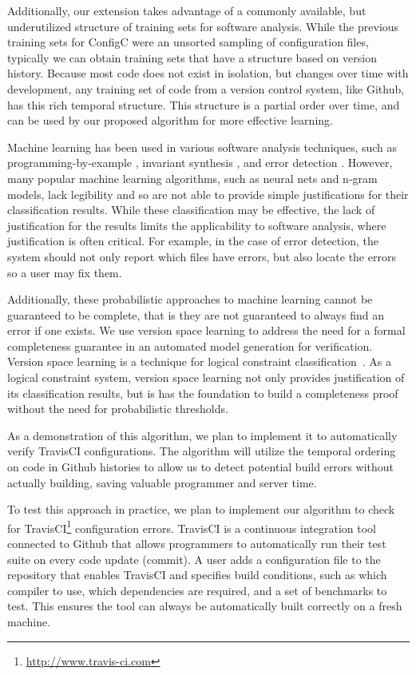 Additionally, our extension takes advantage of a commonly available, but underutilized structure of training sets for software analysis.
While the previous training sets for ConfigC were an unsorted sampling of configuration files, typically we can obtain training sets that have a structure based on version history.
Because most code does not exist in isolation, but changes over time with development, any training set of code from a version control system, like Github, has this rich temporal structure. 
This structure is a partial order over time, and can be used by our proposed algorithm for more effective learning.


Machine learning has been used in various software analysis techniques, such as programming-by-example \cite{lau2000version}, invariant synthesis \cite{garg2014ice}, and error detection \cite{Santolucito2016}.
However, many popular machine learning algorithms, such as neural nets and n-gram models, lack legibility and so are not able to provide simple justifications for their classification results.
While these classification may be effective, the lack of justification for the results limits the applicability to software analysis, where justification is often critical.
For example, in the case of error detection, the system should not only report which files have errors, but also locate the errors so a user may fix them.

Additionally, these probabilistic approaches to machine learning cannot be guaranteed to be complete, that is they are not guaranteed to always find an error if one exists.
We use version space learning to address the need for a formal completeness guarantee in an automated model generation for verification.
Version space learning is a technique for logical constraint classification~\cite{mitchell82}.
As a logical constraint system, version space learning not only provides justification of its classification results, but is has the foundation to build a completeness proof without the need for probabilistic thresholds.

As a demonstration of this algorithm, we plan to implement it to automatically verify TravisCI configurations.
The algorithm will utilize the temporal ordering on code in Github histories to allow us to detect potential build errors without actually building, saving valuable programmer and server time.

To test this approach in practice, we plan to implement our algorithm to check for TravisCI\footnote{\url{http://www.travis-ci.com}} configuration errors.
TravisCI is a continuous integration tool connected to Github that allows programmers to automatically run their test suite on every code update (commit).
A user adds a configuration file to the repository that enables TravisCI and specifies build conditions, such as which compiler to use, which dependencies are required, and a set of benchmarks to test.
This ensures the tool can always be automatically built correctly on a fresh machine.

